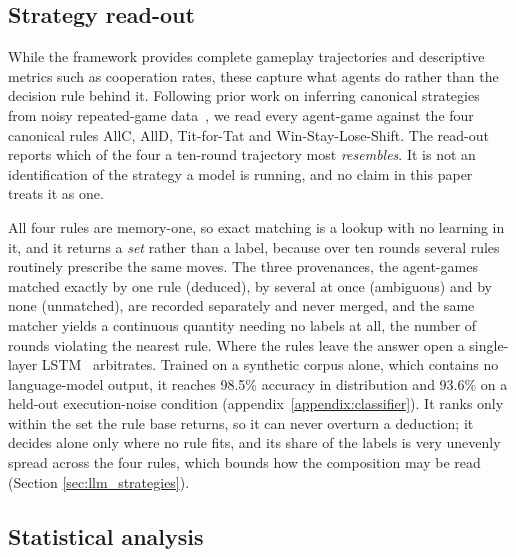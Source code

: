 \documentclass[11pt,a4paper]{article}
\begin{document}
\subsection{Strategy read-out}\label{sec:readout}

While the framework provides complete gameplay trajectories and descriptive
metrics such as cooperation rates, these capture what agents do rather than the
decision rule behind it. Following prior work on inferring canonical strategies
from noisy repeated-game data~\cite{han2013intention,Han2012ALIFEjournal,diStefanoIntention2023},
we read every agent-game against the four canonical rules AllC, AllD,
Tit-for-Tat and Win-Stay-Lose-Shift. The read-out reports which of the four a
ten-round trajectory most \emph{resembles}. It is not an identification of the
strategy a model is running, and no claim in this paper treats it as one.

All four rules are memory-one, so exact matching is a lookup with no learning
in it, and it returns a \emph{set} rather than a label, because over ten rounds
several rules routinely prescribe the same moves. The three provenances, the
agent-games matched exactly by one rule (deduced), by several at once
(ambiguous) and by none (unmatched), are recorded separately and never merged,
and the same matcher yields a continuous quantity needing no labels at all, the
number of rounds violating the nearest rule. Where the rules leave the answer
open a single-layer LSTM~\cite{lstm} arbitrates. Trained on a synthetic corpus alone, which contains no language-model output, it reaches 98.5\% accuracy in distribution and 93.6\% on a held-out
execution-noise condition (appendix~\ref{appendix:classifier}). It ranks only within the set the
rule base returns, so it can never overturn a deduction; it decides alone only
where no rule fits, and its share of the labels is very unevenly spread across
the four rules, which bounds how the composition may be read
(Section \ref{sec:llm_strategies}).

\subsection{Statistical analysis}\label{sec:stats}
\end{document}

